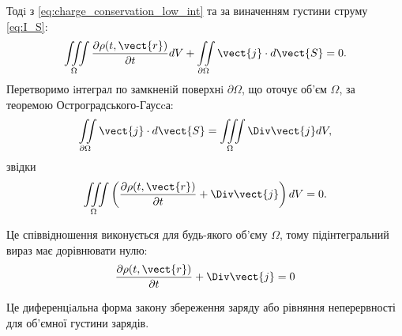 Тодi з \eqref{eq:charge_conservation_low_int}  та за виначенням густини струму \eqref{eq:I_S}:
\begin{equation*}
    \iiint\limits_{\Omega} \frac{\partial\rho(t, \vect{r})}{\partial
    t} dV + \iint\limits_{\partial\Omega} \vect{j}\cdot d\vect{S} = 0.
\end{equation*}
Перетворимо iнтеграл по замкненiй поверхнi $\partial\Omega$, що оточує об'єм $\Omega$, за
теоремою Остроградського-Гаусcа:
\begin{equation*}
    \iint\limits_{\partial\Omega} \vect{j}\cdot d\vect{S} = \iiint\limits_{\Omega}\Div\vect{j} dV,
\end{equation*}
звідки
\begin{equation*}
    \iiint\limits_{\Omega} \left(\frac{\partial\rho(t, \vect{r})}{\partial
    t}  +  \Div\vect{j} \right) dV =0.
\end{equation*}

Це співвідношення виконується для будь-якого об'єму $\Omega$, тому
підінтегральний вираз має дорівнювати нулю:
\begin{equation}\label{eq:charge_conservation_low_diff}
    \frac{\partial\rho(t, \vect{r})}{\partial t}  +  \Div\vect{j}  = 0
\end{equation}

Це диференцiальна форма закону збереження заряду або рівняння неперервності для об’ємної густини зарядів.


